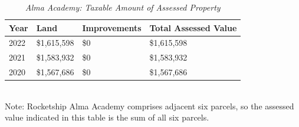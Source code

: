 \begin{table}[hbtp]
  \SingleSpacing%
  \caption[Alma Academy: Taxable Amount of Assessed Propery]{\textit{Alma Academy: Taxable Amount of Assessed Property}}\label{tab:alma-academy-taxable-amount}
  \begin{tabular}{llll}
    \toprule
    Year & Land        & Improvements & Total Assessed Value \\
    \midrule
    2022 & \$1,615,598 & \$0          & \$1,615,598 \\
    2021 & \$1,583,932 & \$0          & \$1,583,932 \\
    2020 & \$1,567,686 & \$0          & \$1,567,686 \\
    \bottomrule
  \end{tabular}\\\newline
  \noindent\footnotesize{Note: Rocketship Alma Academy comprises adjacent six parcels, so the assessed value indicated in this table is the sum of all six parcels.}
\end{table}

